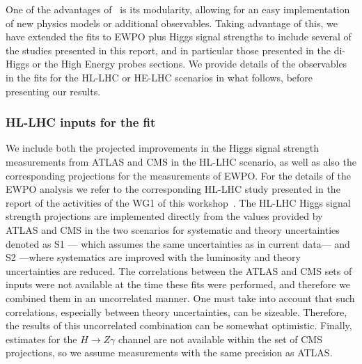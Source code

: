 One of the advantages of \HEPfit~is its modularity, allowing for an
easy implementation of new physics models or additional observables.
Taking advantage of this, we have extended the fits to EWPO plus Higgs 
signal strengths to include several of the studies presented in this report, 
and in particular those presented in the di-Higgs or the High Energy probes sections.
We provide details of the observables in the fits for the HL-LHC or HE-LHC 
scenarios in what follows, before presenting our results.


\subsubsection*{HL-LHC inputs for the fit}

We include both the projected improvements 
in the Higgs signal strength measurements from ATLAS and CMS in the HL-LHC scenario,
as well as also the corresponding projections for the measurements of EWPO.
For the details of the EWPO analysis we refer to the corresponding HL-LHC study 
presented in the report of the activities of the WG1 of this workshop~\cite{Azzi:2650160}.
%
The HL-LHC Higgs signal strength projections are implemented directly from the values
provided by ATLAS and CMS in the two scenarios for systematic and theory uncertainties
denoted as S1 --- which assumes the same uncertainties as in current data--- and S2 ---where systematics
are improved with the luminosity and theory uncertainties are reduced.
%
The correlations between the ATLAS and CMS sets of inputs were not available at the time
these fits were performed, and therefore we combined them in an uncorrelated manner. One must take into 
account that such correlations, especially between theory uncertainties, can be sizeable. Therefore,
the results of this uncorrelated combination can be somewhat optimistic.
Finally, estimates for the $H\to Z\gamma$ channel are not available within the set of CMS projections, so we 
assume measurements with the same precision as ATLAS.

